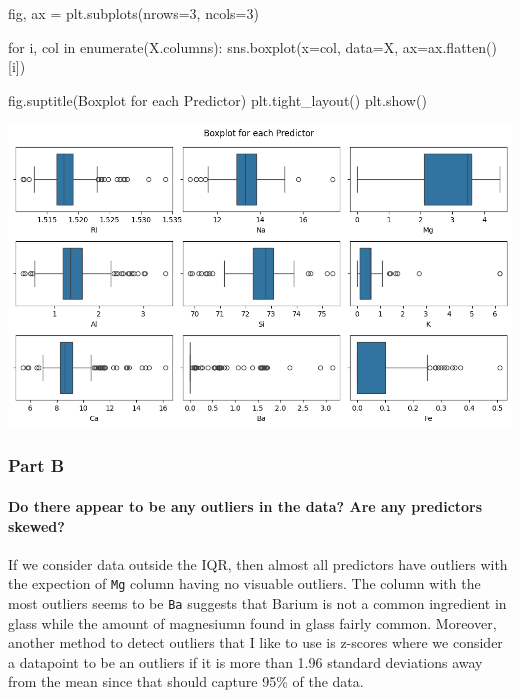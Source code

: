 \documentclass[
  11pt,
]{article}
\let\oldparagraph\paragraph
\renewcommand{\paragraph}[1]{\oldparagraph{#1}\mbox{}}
\newenvironment{Shaded}{\begin{snugshade}}{\end{snugshade}}
\newcommand{\BuiltInTok}[1]{\textcolor[rgb]{0.00,0.23,0.31}{#1}}
\newcommand{\ControlFlowTok}[1]{\textcolor[rgb]{0.00,0.23,0.31}{#1}}
\newcommand{\DecValTok}[1]{\textcolor[rgb]{0.68,0.00,0.00}{#1}}
\newcommand{\KeywordTok}[1]{\textcolor[rgb]{0.00,0.23,0.31}{#1}}
\newcommand{\NormalTok}[1]{\textcolor[rgb]{0.00,0.23,0.31}{#1}}
\newcommand{\OperatorTok}[1]{\textcolor[rgb]{0.37,0.37,0.37}{#1}}
\newcommand{\StringTok}[1]{\textcolor[rgb]{0.13,0.47,0.30}{#1}}
\begin{document}
\begin{Shaded}
\begin{Highlighting}[]
\NormalTok{fig, ax }\OperatorTok{=}\NormalTok{ plt.subplots(nrows}\OperatorTok{=}\DecValTok{3}\NormalTok{, ncols}\OperatorTok{=}\DecValTok{3}\NormalTok{)}

\ControlFlowTok{for}\NormalTok{ i, col }\KeywordTok{in} \BuiltInTok{enumerate}\NormalTok{(X.columns):}
\NormalTok{     sns.boxplot(x}\OperatorTok{=}\NormalTok{col, data}\OperatorTok{=}\NormalTok{X, ax}\OperatorTok{=}\NormalTok{ax.flatten()[i])}

\NormalTok{fig.suptitle(}\StringTok{\textquotesingle{}Boxplot for each Predictor\textquotesingle{}}\NormalTok{)}
\NormalTok{plt.tight\_layout()}
\NormalTok{plt.show()   }
\end{Highlighting}
\end{Shaded}

\includegraphics{hw4_files/figure-pdf/cell-10-output-1.png}

\subsubsection{Part B}\label{part-b}

\paragraph{Do there appear to be any outliers in the data? Are any
predictors
skewed?}\label{do-there-appear-to-be-any-outliers-in-the-data-are-any-predictors-skewed}

If we consider data outside the IQR, then almost all predictors have
outliers with the expection of \texttt{Mg} column having no visuable
outliers. The column with the most outliers seems to be \texttt{Ba}
suggests that Barium is not a common ingredient in glass while the
amount of magnesiumn found in glass fairly common. Moreover, another
method to detect outliers that I like to use is z-scores where we
consider a datapoint to be an outliers if it is more than 1.96 standard
deviations away from the mean since that should capture 95\% of the
data.
\end{document}
